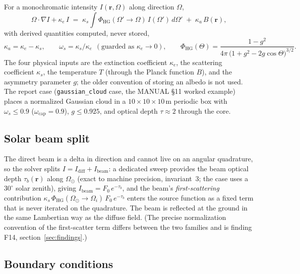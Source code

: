 \documentclass[11pt,a4paper]{article}
\newcommand{\ke}{\kappa_e}
\newcommand{\ks}{\kappa_s}
\newcommand{\ka}{\kappa_a}
\newcommand{\Om}{\Omega}
\begin{document}
For a monochromatic intensity $I(\mathbf r,\Om)$ along direction $\Om$,
\begin{equation}
\Om\cdot\nabla I + \ke\, I
\;=\; \ks\!\int \Phi_{\mathrm{HG}}(\Om'\to\Om)\, I(\Om')\,d\Om'
\;+\; \ka\, B(\mathbf r),
\label{eq:rte}
\end{equation}
with derived quantities computed, never stored,
\begin{equation}
\ka=\ke-\ks,\qquad
\omega_s=\ks/\ke\ \ (\text{guarded as } \ke\to0),\qquad
\Phi_{\mathrm{HG}}(\Theta)=\frac{1-g^2}{4\pi\,\bigl(1+g^2-2g\cos\Theta\bigr)^{3/2}} .
\end{equation}
The four physical inputs are the extinction coefficient $\ke$, the
scattering coefficient $\ks$, the temperature $T$ (through the Planck
function $B$), and the asymmetry parameter $g$; the older convention of
storing an albedo is not used. The report case (\texttt{gaussian\_cloud}
case, the MANUAL \S11 worked example) places a normalized Gaussian cloud
in a $10\times10\times10$\,m periodic box with $\omega_s\le0.9$
($\omega_{\mathrm{cap}}=0.9$), $g\le0.925$, and optical depth
$\tau\approx2$ through the core.

\subsection{Solar beam split}

The direct beam is a delta in direction and cannot live on an angular
quadrature, so the solver splits $I=I_{\mathrm{diff}}+I_{\mathrm{beam}}$:
a dedicated sweep provides the beam optical depth $\tau_b(\mathbf r)$
along $\Om_{\odot}$ (exact to machine precision, invariant~3; the case uses
a $30^\circ$ solar zenith), giving $I_{\mathrm{beam}}=F_0\,
e^{-\tau_b}$, and the beam's \emph{first-scattering} contribution
$\ks\,\Phi_{\mathrm{HG}}(\Om_\odot\to\Om_i)\,F_0\,e^{-\tau_b}$ enters the
source function as a fixed term that is never iterated on the
quadrature. The beam is reflected at the ground in the same Lambertian
way as the diffuse field. (The precise normalization convention of the
first-scatter term differs between the two families and is finding F14,
section~\ref{sec:findings}.)

\subsection{Boundary conditions}
\end{document}
